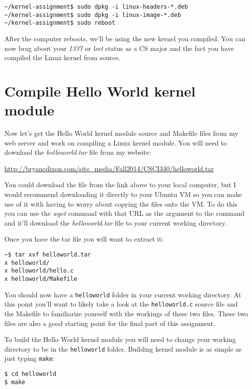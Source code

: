 \documentclass[11pt]{article}
\begin{document}
\begin{verbatim}
~/kernel-assignment$ sudo dpkg -i linux-headers-*.deb
~/kernel-assignment$ sudo dpkg -i linux-image-*.deb
~/kernel-assignment$ sudo reboot
\end{verbatim}

After the computer reboots, we'll be using the new kernel you compiled. You can now brag about your \emph{1337} or \emph{leet} status as a CS major and the fact you have compiled the Linux kernel from source. 

\section*{Compile Hello World kernel module}

Now let's get the Hello World kernel module source and Makefile files from my web server and work on compiling a Linux kernel module. You will need to download the {\it helloworld.tar} file from my website:

{\url{http://bryancdixon.com/site_media/Fall2014/CSCI340/helloworld.tar}}

You could download the file from the link above to your local computer, but I would recommend downloading it directly to your Ubuntu VM so you can make use of it with having to worry about copying the files onto the VM. To do this you can use the {\it wget} command with that URL as the argument to the command and it'll download the {\it helloworld.tar} file to your current working directory.

Once you have the tar file you will want to extract it:

\begin{verbatim}
~$ tar xvf helloworld.tar
x helloworld/
x helloworld/hello.c
x helloworld/Makefile
\end{verbatim}

You should now have a \texttt{helloworld} folder in your current working directory. At this point you'll want to likely take a look at the \texttt{helloworld.c} source file and the Makefile to familiarize yourself with the workings of these two files. These two files are also a good starting point for the final part of this assignment. 

To build the Hello World kernel module you will need to change your working directory to be in the \texttt{helloworld} folder. Building kernel module is as simple as just typing \texttt{make}:

\begin{verbatim}
$ cd helloworld
$ make
\end{verbatim}
\end{document}
